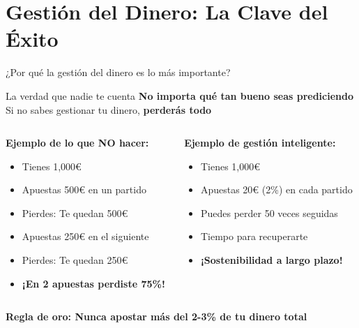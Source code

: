 \documentclass[aspectratio=169]{beamer}
\begin{document}
\section{Gestión del Dinero: La Clave del Éxito}

\begin{frame}{¿Por qué la gestión del dinero es lo más importante?}
\begin{alertblock}{La verdad que nadie te cuenta}
\Large
\textbf{No importa qué tan bueno seas prediciendo} \\
Si no sabes gestionar tu dinero, \textcolor{rojoperdida}{\textbf{perderás todo}}
\end{alertblock}

\vspace{0.5cm}

\begin{columns}
\begin{column}{0.5\textwidth}
\textbf{\textcolor{rojoperdida}{Ejemplo de lo que NO hacer:}}
\begin{itemize}
\item Tienes 1,000€
\item Apuestas 500€ en un partido
\item Pierdes: Te quedan 500€
\item Apuestas 250€ en el siguiente
\item Pierdes: Te quedan 250€
\item \textbf{¡En 2 apuestas perdiste 75\%!}
\end{itemize}
\end{column}

\begin{column}{0.5\textwidth}
\textbf{\textcolor{verdeganancia}{Ejemplo de gestión inteligente:}}
\begin{itemize}
\item Tienes 1,000€
\item Apuestas 20€ (2\%) en cada partido
\item Puedes perder 50 veces seguidas
\item Tiempo para recuperarte
\item \textbf{¡Sostenibilidad a largo plazo!}
\end{itemize}
\end{column}
\end{columns}

\vspace{0.5cm}
\begin{center}
\textbf{Regla de oro: Nunca apostar más del 2-3\% de tu dinero total}
\end{center}
\end{frame}
\end{document}
